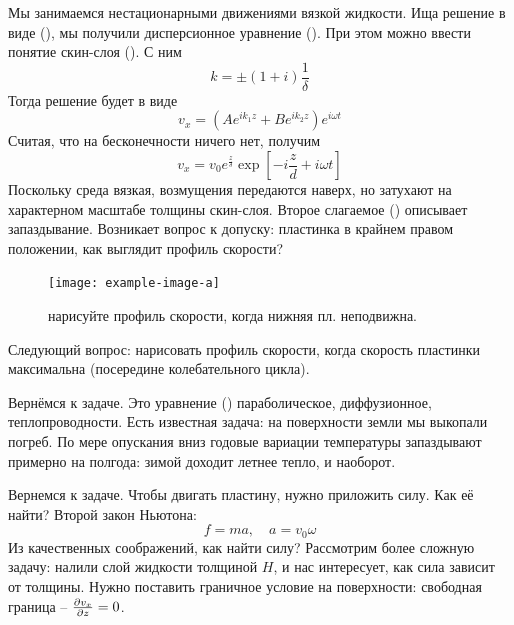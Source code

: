 Мы занимаемся нестационарными движениями вязкой жидкости.
Ища решение в виде (), мы получили дисперсионное уравнение (). 
При этом можно ввести понятие скин-слоя (). С ним
\begin{equation}
    k=\pm (1+i) \frac{1}{\delta}
\end{equation}
Тогда решение будет в виде
\begin{equation}
    v_x=(Ae^{ik_1 z}+Be^{ik_2 z})e^{i\omega t}
\end{equation}
Считая, что на бесконечности ничего нет, получим
\begin{equation}
    v_x=v_0 e^{\frac{z}{\delta}} \exp[-i \frac{z}{d}+ i\omega t]
\end{equation}
Поскольку среда вязкая, возмущения передаются наверх, но затухают на характерном масштабе толщины скин-слоя. Второе слагаемое () описывает запаздывание. Возникает вопрос к допуску: пластинка в крайнем правом положении, как выглядит профиль скорости?
\begin{figure}[tb]
    \centering
    \texttt{[image: example-image-a]}
    \caption{нарисуйте профиль скорости, когда нижняя пл. неподвижна.}
    \label{fig:figure1}
\end{figure}
Следующий вопрос: нарисовать профиль скорости, когда скорость пластинки максимальна (посередине колебательного цикла).  

Вернёмся к задаче. 
Это уравнение () параболическое, диффузионное, теплопроводности. 
Есть известная задача: на поверхности земли мы выкопали погреб. 
По мере опускания вниз годовые вариации температуры запаздывают примерно на полгода: зимой доходит летнее тепло, и наоборот.



Вернемся к задаче. Чтобы двигать пластину, нужно приложить силу. Как её найти? Второй закон Ньютона:
\begin{equation}
    f=ma, \quad a=v_0 \omega
\end{equation}
Из качественных соображений, как найти силу? Рассмотрим более сложную задачу: налили слой жидкости толщиной $H$, и нас интересует, как сила зависит от толщины. Нужно поставить граничное условие на поверхности: свободная граница -- $\pdv{v_x}{z}=0$.

